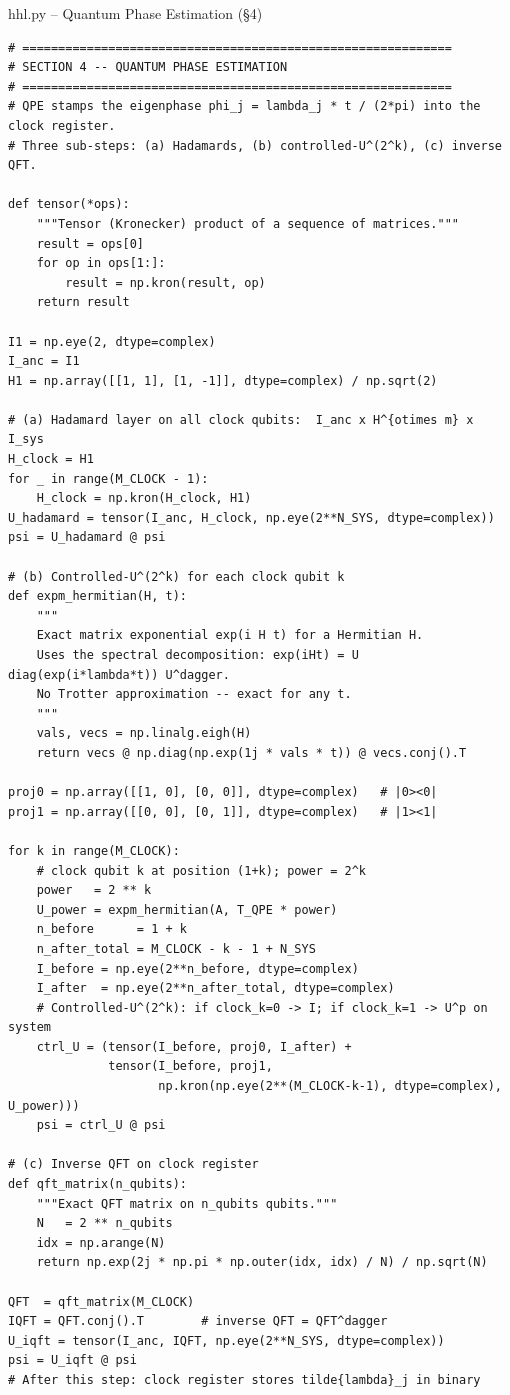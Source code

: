 \documentclass{beamer}
\begin{document}

\begin{frame}{hhl.py -- Quantum Phase Estimation (\S4)}
\begin{lstlisting}
# ============================================================
# SECTION 4 -- QUANTUM PHASE ESTIMATION
# ============================================================
# QPE stamps the eigenphase phi_j = lambda_j * t / (2*pi) into the clock register.
# Three sub-steps: (a) Hadamards, (b) controlled-U^(2^k), (c) inverse QFT.

def tensor(*ops):
    """Tensor (Kronecker) product of a sequence of matrices."""
    result = ops[0]
    for op in ops[1:]:
        result = np.kron(result, op)
    return result

I1 = np.eye(2, dtype=complex)
I_anc = I1
H1 = np.array([[1, 1], [1, -1]], dtype=complex) / np.sqrt(2)

# (a) Hadamard layer on all clock qubits:  I_anc x H^{otimes m} x I_sys
H_clock = H1
for _ in range(M_CLOCK - 1):
    H_clock = np.kron(H_clock, H1)
U_hadamard = tensor(I_anc, H_clock, np.eye(2**N_SYS, dtype=complex))
psi = U_hadamard @ psi

# (b) Controlled-U^(2^k) for each clock qubit k
def expm_hermitian(H, t):
    """
    Exact matrix exponential exp(i H t) for a Hermitian H.
    Uses the spectral decomposition: exp(iHt) = U diag(exp(i*lambda*t)) U^dagger.
    No Trotter approximation -- exact for any t.
    """
    vals, vecs = np.linalg.eigh(H)
    return vecs @ np.diag(np.exp(1j * vals * t)) @ vecs.conj().T

proj0 = np.array([[1, 0], [0, 0]], dtype=complex)   # |0><0|
proj1 = np.array([[0, 0], [0, 1]], dtype=complex)   # |1><1|

for k in range(M_CLOCK):
    # clock qubit k at position (1+k); power = 2^k
    power   = 2 ** k
    U_power = expm_hermitian(A, T_QPE * power)
    n_before      = 1 + k
    n_after_total = M_CLOCK - k - 1 + N_SYS
    I_before = np.eye(2**n_before, dtype=complex)
    I_after  = np.eye(2**n_after_total, dtype=complex)
    # Controlled-U^(2^k): if clock_k=0 -> I; if clock_k=1 -> U^p on system
    ctrl_U = (tensor(I_before, proj0, I_after) +
              tensor(I_before, proj1,
                     np.kron(np.eye(2**(M_CLOCK-k-1), dtype=complex), U_power)))
    psi = ctrl_U @ psi

# (c) Inverse QFT on clock register
def qft_matrix(n_qubits):
    """Exact QFT matrix on n_qubits qubits."""
    N   = 2 ** n_qubits
    idx = np.arange(N)
    return np.exp(2j * np.pi * np.outer(idx, idx) / N) / np.sqrt(N)

QFT  = qft_matrix(M_CLOCK)
IQFT = QFT.conj().T        # inverse QFT = QFT^dagger
U_iqft = tensor(I_anc, IQFT, np.eye(2**N_SYS, dtype=complex))
psi = U_iqft @ psi
# After this step: clock register stores tilde{lambda}_j in binary
\end{lstlisting}
\end{frame}
\end{document}
